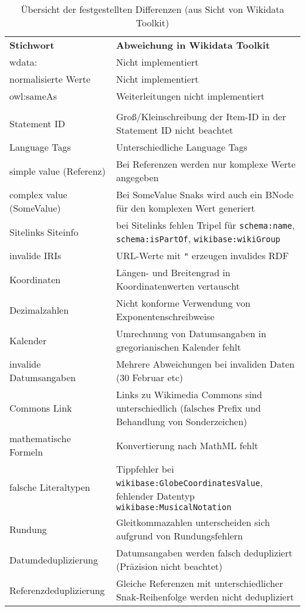 \begin{table}
  \begin{tabular}{lp{}}
    \bfseries{Stichwort} & \bfseries{Abweichung in Wikidata Toolkit} \\
    wdata: & Nicht implementiert \\
    normalisierte Werte & Nicht implementiert \\
    owl:sameAs & Weiterleitungen nicht implementiert \\
    \\
    Statement ID & Groß/Kleinschreibung der Item-ID in der Statement ID nicht beachtet \\
    Language Tags & Unterschiedliche Language Tags \\
    simple value (Referenz) & Bei Referenzen werden nur komplexe Werte angegeben \\
    complex value (SomeValue) & Bei SomeValue Snaks wird auch ein BNode für den komplexen Wert generiert \\
    Sitelinks Siteinfo & bei Sitelinks fehlen Tripel für \verb|schema:name|, \verb|schema:isPartOf|, \verb|wikibase:wikiGroup| \\
    invalide IRIs & URL-Werte mit \verb|"| erzeugen invalides RDF \\
    Koordinaten & Längen- und Breitengrad in Koordinatenwerten vertauscht \\
    Dezimalzahlen & Nicht konforme Verwendung von Exponentenschreibweise \\
    Kalender & Umrechnung von Datumsangaben in gregorianischen Kalender fehlt \\
    invalide Datumsangaben & Mehrere Abweichungen bei invaliden Daten (30 Februar etc) \\
    Commons Link & Links zu Wikimedia Commons sind unterschiedlich (falsches Prefix und Behandlung von Sonderzeichen) \\
    mathematische Formeln & Konvertierung nach MathML fehlt \\
    falsche Literaltypen & Tippfehler bei \verb|wikibase:GlobeCoordinatesValue|, fehlender Datentyp \verb|wikibase:MusicalNotation| \\
    Rundung & Gleitkommazahlen unterscheiden sich aufgrund von Rundungsfehlern \\
    Datumdeduplizierung & Datumsangaben werden falsch dedupliziert (Präzision nicht beachtet) \\
    Referenzdeduplizierung & Gleiche Referenzen mit unterschiedlicher Snak-Reihenfolge werden nicht dedupliziert
  \end{tabular}
  \caption{Übersicht der festgestellten Differenzen (aus Sicht von Wikidata Toolkit)}
  \label{tab:wdtk-diff}
\end{table}

